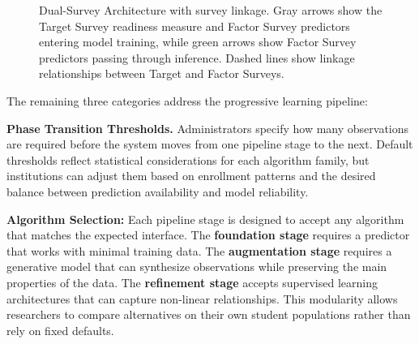 \documentclass[letterpaper,11pt]{article}
\begin{document}
\begin{figure}[htbp]
{
}%
\label{fig:linkage}
\caption{Dual-Survey Architecture with survey linkage. Gray arrows show the Target Survey readiness measure and Factor Survey predictors entering model training, while green arrows show Factor Survey predictors passing through inference. Dashed lines show linkage relationships between Target and Factor Surveys.}
\end{figure}

The remaining three categories address the progressive learning pipeline:

\textbf{Phase Transition Thresholds.} Administrators specify how many observations are required before the system moves from one pipeline stage to the next. Default thresholds reflect statistical considerations for each algorithm family, but institutions can adjust them based on enrollment patterns and the desired balance between prediction availability and model reliability.

\textbf{Algorithm Selection:} Each pipeline stage is designed to accept any algorithm that matches the expected interface. The \textbf{foundation stage} requires a predictor that works with minimal training data. The \textbf{augmentation stage} requires a generative model that can synthesize observations while preserving the main properties of the data. The \textbf{refinement stage} accepts supervised learning architectures that can capture non-linear relationships. This modularity allows researchers to compare alternatives on their own student populations rather than rely on fixed defaults.
\end{document}
